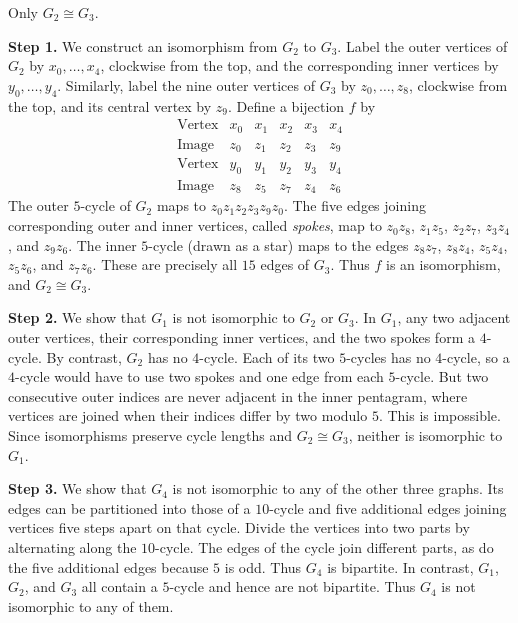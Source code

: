 \documentclass[11pt,oneside]{article}
\begin{document}
\begin{solution}
Only $G_2\cong G_3$.

\par\medskip\noindent\textbf{Step 1.} We construct an isomorphism from $G_2$ to $G_3$.
Label the outer vertices of $G_2$ by $x_0,\dots,x_4$, clockwise from the top,
and the corresponding inner vertices by $y_0,\dots,y_4$. Similarly, label the
nine outer vertices of $G_3$ by $z_0,\dots,z_8$, clockwise from the top, and
its central vertex by $z_9$. Define a bijection $f$ by
\[
\begin{array}{c|ccccc}
\text{Vertex}&x_0&x_1&x_2&x_3&x_4\\\hline
\text{Image}&z_0&z_1&z_2&z_3&z_9\\[3pt]
\text{Vertex}&y_0&y_1&y_2&y_3&y_4\\\hline
\text{Image}&z_8&z_5&z_7&z_4&z_6
\end{array}
\]
The outer $5$-cycle of $G_2$ maps to
$z_0z_1z_2z_3z_9z_0$. The five edges joining corresponding outer and inner vertices, called \emph{spokes}, map to
$z_0z_8$, $z_1z_5$, $z_2z_7$, $z_3z_4$, and $z_9z_6$.
The inner $5$-cycle (drawn as a star) maps to the edges
$z_8z_7$, $z_8z_4$, $z_5z_4$, $z_5z_6$, and $z_7z_6$.
These are precisely all $15$ edges of $G_3$. Thus $f$ is an isomorphism,
and $G_2\cong G_3$.

\par\medskip\noindent\textbf{Step 2.} We show that $G_1$ is not isomorphic to
$G_2$ or $G_3$. In $G_1$, any two adjacent outer vertices, their
corresponding inner vertices, and the two spokes form a $4$-cycle.
By contrast, $G_2$ has no $4$-cycle. Each of its two $5$-cycles has no
$4$-cycle, so a $4$-cycle would have to use two spokes and one edge from
each $5$-cycle. But two consecutive outer indices are never adjacent
in the inner pentagram, where vertices are joined when their indices
differ by two modulo $5$. This is impossible. Since isomorphisms
preserve cycle lengths and $G_2\cong G_3$, neither is isomorphic to $G_1$.

\par\medskip\noindent\textbf{Step 3.} We show that $G_4$ is not isomorphic to
any of the other three graphs. Its edges can be partitioned into those of a $10$-cycle and five additional
edges joining vertices five steps apart on that cycle. Divide the vertices
into two parts by alternating along the $10$-cycle. The edges of the cycle
join different parts, as do the five additional edges because $5$ is odd.
Thus $G_4$ is bipartite. In contrast, $G_1$, $G_2$, and $G_3$ all
contain a $5$-cycle and hence are not bipartite. Thus $G_4$ is not
isomorphic to any of them.
\end{solution}
\end{document}
